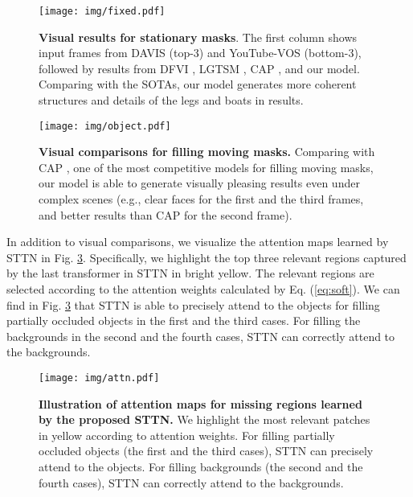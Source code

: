 \documentclass[runningheads]{llncs}
\begin{document}
\begin{figure}[t]
   \begin{center}
      \texttt{[image: img/fixed.pdf]}
   \end{center}
   \caption{\textbf{Visual results for stationary masks}. The first column shows input frames from DAVIS \cite{caelles20182018} (top-3) and YouTube-VOS \cite{xu2018youtube} (bottom-3), followed by results from DFVI \cite{xu2019deep}, LGTSM \cite{chang2019learnable}, CAP \cite{lee2019copy}, and our model. Comparing with the SOTAs, our model generates more coherent structures and details of the legs and boats in results.}
   \label{fig:visfix}
\end{figure}

\begin{figure}
   \begin{center}
      \texttt{[image: img/object.pdf]}
   \end{center}
   \caption{\textbf{Visual comparisons for filling moving masks.} Comparing with CAP \cite{lee2019copy}, one of the most competitive models for filling moving masks, our model is able to generate visually pleasing results even under complex scenes (e.g., clear faces for the first and the third frames, and better results than CAP for the second frame). }
   \label{fig:visobj}
\end{figure}

In addition to visual comparisons, we visualize the attention maps learned by STTN in Fig. \ref{fig:visatn}. Specifically, we highlight the top three relevant regions captured by the last transformer in STTN in bright yellow. 
The relevant regions are selected according to the attention weights calculated by Eq. (\ref{eq:soft}). We can find in Fig. \ref{fig:visatn} that STTN is able to precisely attend to the objects for filling partially occluded objects in the first and the third cases. For filling the backgrounds in the second and the fourth cases, STTN can correctly attend to the backgrounds. 


\begin{figure}
   \begin{center}
      \texttt{[image: img/attn.pdf]}
   \end{center}
   \caption{
  \textbf{Illustration of attention maps for missing regions learned by the proposed STTN.}
   We highlight the most relevant patches in yellow according to attention weights. For filling partially occluded objects (the first and the third cases), STTN can precisely attend to the objects. For filling backgrounds (the second and the fourth cases), STTN can correctly attend to the backgrounds.}
   \label{fig:visatn}
\end{figure}  
\end{document}
